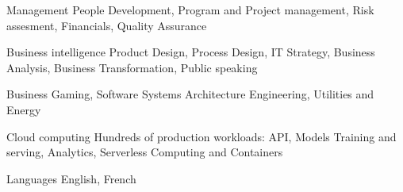 
\begin{cvskills}

  \cvskill
    {Management} %
    {People Development, Program and Project management, Risk assesment, Financials, Quality Assurance} %

  \cvskill
    {Business intelligence} %
    {Product Design, Process Design, IT Strategy, Business Analysis, Business Transformation, Public speaking} %

  \cvskill
    {Business} %
    {Gaming, Software Systems Architecture Engineering, Utilities and Energy} %

  \cvskill
    {Cloud computing} %
    {Hundreds of production workloads: API, Models Training and serving, Analytics, Serverless Computing and Containers} %



  \cvskill
    {Languages} %
    {English, French} %

\end{cvskills}
